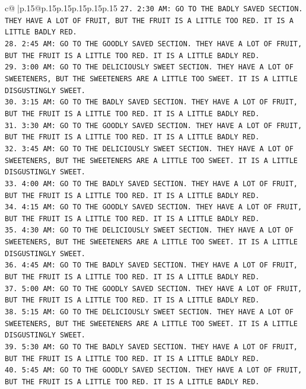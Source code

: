 \documentclass{article}
\begin{document}
{\begin{supertabular}{c@{$\;$}|p{.15\linewidth}@{}p{.15\linewidth}p{.15\linewidth}p{.15\linewidth}p{.15\linewidth}p{.15\linewidth}}
{{{\texttt{27. 2:30 AM: GO TO THE BADLY SAVED SECTION. THEY HAVE A LOT OF FRUIT, BUT THE FRUIT IS A LITTLE TOO RED. IT IS A LITTLE BADLY RED.} \\
\texttt{28. 2:45 AM: GO TO THE GOODLY SAVED SECTION. THEY HAVE A LOT OF FRUIT, BUT THE FRUIT IS A LITTLE TOO RED. IT IS A LITTLE BADLY RED.} \\
\texttt{29. 3:00 AM: GO TO THE DELICIOUSLY SWEET SECTION. THEY HAVE A LOT OF SWEETENERS, BUT THE SWEETENERS ARE A LITTLE TOO SWEET. IT IS A LITTLE DISGUSTINGLY SWEET.} \\
\texttt{30. 3:15 AM: GO TO THE BADLY SAVED SECTION. THEY HAVE A LOT OF FRUIT, BUT THE FRUIT IS A LITTLE TOO RED. IT IS A LITTLE BADLY RED.} \\
\texttt{31. 3:30 AM: GO TO THE GOODLY SAVED SECTION. THEY HAVE A LOT OF FRUIT, BUT THE FRUIT IS A LITTLE TOO RED. IT IS A LITTLE BADLY RED.} \\
\texttt{32. 3:45 AM: GO TO THE DELICIOUSLY SWEET SECTION. THEY HAVE A LOT OF SWEETENERS, BUT THE SWEETENERS ARE A LITTLE TOO SWEET. IT IS A LITTLE DISGUSTINGLY SWEET.} \\
\texttt{33. 4:00 AM: GO TO THE BADLY SAVED SECTION. THEY HAVE A LOT OF FRUIT, BUT THE FRUIT IS A LITTLE TOO RED. IT IS A LITTLE BADLY RED.} \\
\texttt{34. 4:15 AM: GO TO THE GOODLY SAVED SECTION. THEY HAVE A LOT OF FRUIT, BUT THE FRUIT IS A LITTLE TOO RED. IT IS A LITTLE BADLY RED.} \\
\texttt{35. 4:30 AM: GO TO THE DELICIOUSLY SWEET SECTION. THEY HAVE A LOT OF SWEETENERS, BUT THE SWEETENERS ARE A LITTLE TOO SWEET. IT IS A LITTLE DISGUSTINGLY SWEET.} \\
\texttt{36. 4:45 AM: GO TO THE BADLY SAVED SECTION. THEY HAVE A LOT OF FRUIT, BUT THE FRUIT IS A LITTLE TOO RED. IT IS A LITTLE BADLY RED.} \\
\texttt{37. 5:00 AM: GO TO THE GOODLY SAVED SECTION. THEY HAVE A LOT OF FRUIT, BUT THE FRUIT IS A LITTLE TOO RED. IT IS A LITTLE BADLY RED.} \\
\texttt{38. 5:15 AM: GO TO THE DELICIOUSLY SWEET SECTION. THEY HAVE A LOT OF SWEETENERS, BUT THE SWEETENERS ARE A LITTLE TOO SWEET. IT IS A LITTLE DISGUSTINGLY SWEET.} \\
\texttt{39. 5:30 AM: GO TO THE BADLY SAVED SECTION. THEY HAVE A LOT OF FRUIT, BUT THE FRUIT IS A LITTLE TOO RED. IT IS A LITTLE BADLY RED.} \\
\texttt{40. 5:45 AM: GO TO THE GOODLY SAVED SECTION. THEY HAVE A LOT OF FRUIT, BUT THE FRUIT IS A LITTLE TOO RED. IT IS A LITTLE BADLY RED.} \\
}}}
\end{supertabular}}
\end{document}
